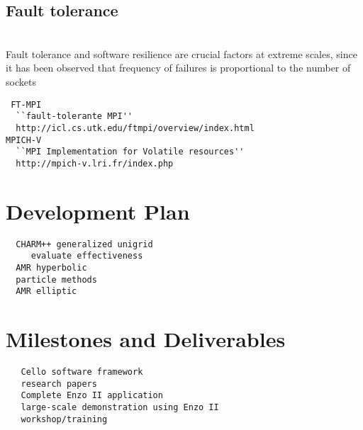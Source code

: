 \documentclass[14pt,letter]{article}
\begin{document}
\subsection{Fault tolerance} \label{ss:fault-tolerance}

\ \\  Fault tolerance and software
resilience are crucial factors at extreme scales, since it has been
observed that frequency of failures is proportional to the number of
sockets~\cite{@@@}

\begin{verbatim}
 FT-MPI 
  ``fault-tolerante MPI''
  http://icl.cs.utk.edu/ftmpi/overview/index.html 
MPICH-V 
  ``MPI Implementation for Volatile resources''
  http://mpich-v.lri.fr/index.php 
\end{verbatim}

\section{Development Plan} \label{s:plan} 

\begin{verbatim}
  CHARM++ generalized unigrid
     evaluate effectiveness
  AMR hyperbolic
  particle methods
  AMR elliptic
\end{verbatim}

\section{Milestones and Deliverables} \label{s:milestones}

\begin{verbatim}
   Cello software framework
   research papers
   Complete Enzo II application
   large-scale demonstration using Enzo II
   workshop/training
\end{verbatim}



\end{document}

